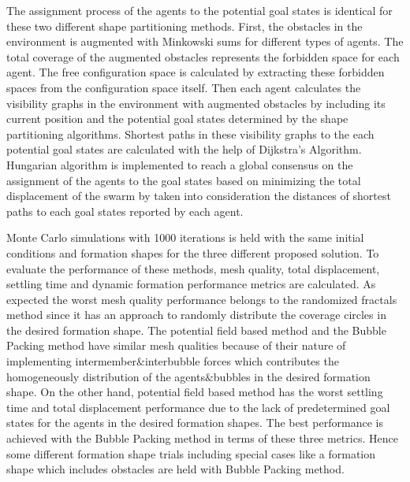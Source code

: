 The assignment process of the agents to the potential goal states is identical for these two different shape partitioning methods. First, the obstacles in the environment is augmented with Minkowski sums for different types of agents. The total coverage of the augmented obstacles represents the forbidden space for each agent. The free configuration space is calculated by extracting these forbidden spaces from the configuration space itself. Then each agent calculates the visibility graphs in the environment with augmented obstacles by including its current position and the potential goal states determined by the shape partitioning algorithms. Shortest paths in these visibility graphs to the each potential goal states are calculated with the help of Dijkstra's Algorithm. Hungarian algorithm is implemented to reach a global consensus on the assignment of the agents to the goal states based on minimizing the total displacement of the swarm by taken into consideration the distances of shortest paths to each goal states reported by each agent. 
       
Monte Carlo simulations with 1000 iterations is held with the same initial conditions and formation shapes for the three different proposed solution. To evaluate the performance of these methods, mesh quality, total displacement, settling time and dynamic formation performance metrics are calculated. As expected the worst mesh quality performance belongs to the randomized fractals method since it has an approach to randomly distribute the coverage circles in the desired formation shape. The potential field based method and the Bubble Packing method have similar mesh qualities because of their nature of implementing intermember$\&$interbubble forces which contributes the homogeneously distribution of the agents$\&$bubbles in the desired formation shape. On the other hand, potential field based method has the worst settling time and total displacement performance due to the lack of predetermined goal states for the agents in the desired formation shapes. The best performance is achieved with the Bubble Packing method in terms of these three metrics. Hence some different formation shape trials including special cases like a formation shape which includes obstacles are held with Bubble Packing method. 
       
